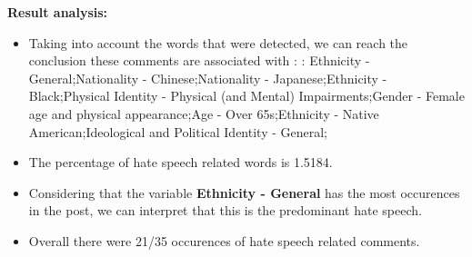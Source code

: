 \documentclass[11pt]{article}
\begin{document}
\textbf{\Large Result analysis:}

\begin{itemize}\item Taking into account the words that were detected, we can reach the conclusion these comments are associated with : : Ethnicity - General;Nationality - Chinese;Nationality - Japanese;Ethnicity - Black;Physical Identity - Physical (and Mental) Impairments;Gender - Female age and physical appearance;Age - Over 65s;Ethnicity - Native American;Ideological and Political Identity - General;%

\item The percentage of hate speech related words is 1.5184.

\item Considering that the variable \textbf{Ethnicity - General} has the most occurences in the post, we can interpret that this is the predominant hate speech.

\item Overall there were 21/35 occurences of hate speech related comments.\end{itemize}
\end{document}
